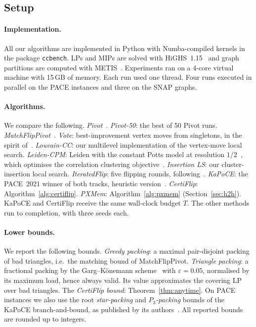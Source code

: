\subsection{Setup}

\paragraph{Implementation.}  All our algorithms are implemented in Python
with Numba-compiled kernels in the package \texttt{ccbench}.  LPs and MIPs are
solved with HiGHS~1.15~\citep{HuangfuH18} and graph partitions are computed
with METIS~\citep{KarypisK98}.  Experiments ran on a 4-core virtual machine
with 15\,GB of memory.  Each run used one thread.  Four runs executed in parallel on the PACE
instances and three on the SNAP graphs.

\paragraph{Algorithms.}  We compare the following.
\emph{Pivot}~\citep{AilonCN08}.
\emph{Pivot-50}: the best of 50 Pivot runs.
\emph{MatchFlipPivot}~\citep{veldt2022stc}.
\emph{Vote}: best-improvement vertex moves from singletons, in the spirit
of~\citep{elsner2009bounding}.
\emph{Louvain-CC}: our multilevel implementation of the vertex-move local
search.
\emph{Leiden-CPM}: Leiden with the constant Potts model at resolution
$1/2$~\citep{TraagWvE19}, which optimises the correlation clustering
objective~\citep{veldt2018lambdacc}.
\emph{Insertion LS}: our cluster-insertion local search.
\emph{IteratedFlip}: five flipping rounds, following~\citep{CohenAddadLPTYZ24}.
\emph{KaPoCE}: the PACE~2021 winner of both tracks, heuristic
version~\citep{BlasiusEtAl21kapoceHeur}.
\emph{CertiFlip}: Algorithm~\ref{alg:certiflip}.
\emph{PXMem}: Algorithm~\ref{alg:pxmem} (Section~\ref{sec:h2h}).
KaPoCE and CertiFlip receive the same wall-clock budget $T$.  The other
methods run to completion, with three seeds each.

\paragraph{Lower bounds.}  We report the following bounds.
\emph{Greedy packing}: a maximal pair-disjoint packing of bad triangles, i.e.\
the matching bound of MatchFlipPivot.
\emph{Triangle packing}: a fractional packing by the Garg--K\"onemann
scheme~\citep{GargK07,Fleischer00} with $\varepsilon=0.05$, normalised by its
maximum load, hence always valid.  Its value approximates the covering LP
over bad triangles.
The \emph{CertiFlip bound}: Theorem~\ref{thm:anytime}.
On PACE instances we also use the root \emph{star-packing} and
\emph{$P_3$-packing} bounds of the KaPoCE branch-and-bound, as published by
its authors~\citep{BlasiusEtAl22sea}.  All reported bounds are rounded up to
integers.

